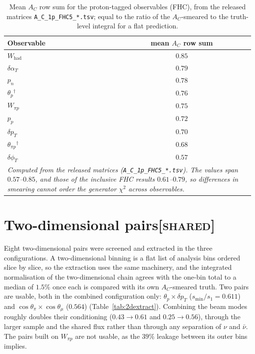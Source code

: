 \documentclass[11pt,a4paper]{article}
\newcommand{\scopetag}[1]{\hfill{\normalfont\small\textsc{[#1]}}}
\begin{document}
\begin{table}[H]
  \centering
  \caption{Mean $A_C$ row sum for the proton-tagged observables (FHC), from the released
    matrices \texttt{A\_C\_1p\_FHC5\_*.tsv}; equal to the ratio of the
    $A_C$-smeared to the truth-level integral for a flat prediction.}
  \label{tab:acwtki}
  \par\smallskip{}
  \begin{tabular}{lc}
      \toprule
      Observable & mean $A_C$ row sum \\
      \midrule
      $W_\mathrm{had}$   & $0.85$ \\
      $\delta\alpha_T$   & $0.79$ \\
      $p_n$              & $0.78$ \\
      $\theta_p$$^{\dagger}$         & $0.76$ \\
      $W_{\pi p}$        & $0.75$ \\
      $p_p$              & $0.72$ \\
      $\delta p_T$       & $0.70$ \\
      $\theta_{\pi p}$$^{\dagger}$      & $0.68$ \\
      $\delta\phi_T$     & $0.57$ \\
      \midrule
      \multicolumn{2}{p{0.72\textwidth}}{\emph{Computed from the released matrices
        (\texttt{A\_C\_1p\_FHC5\_*.tsv}). The values span $0.57$--$0.85$, and those of the
        inclusive FHC results $0.61$--$0.79$, so differences in smearing cannot order the
        generator $\chi^2$ across observables.}} \\
      \bottomrule
    \end{tabular}
\end{table}


\section[Two-dimensional pairs]{Two-dimensional pairs\scopetag{shared}}
\label{sec:supp_2d}

Eight two-dimensional pairs were screened and extracted in the three configurations. A
two-dimensional binning is a flat list of analysis bins ordered slice by slice, so the extraction
uses the same machinery, and the integrated normalisation of the two-dimensional chain agrees with
the one-bin total to a median of $1.5\%$ once each is compared with its own $A_C$-smeared truth.
Two pairs are usable, both in the combined configuration only: $\theta_p\times\delta p_T$
($s_{\min}/s_1=0.611$) and $\cos\theta_\pi\times\cos\theta_\mu$ ($0.564$) (Table~\ref{tab:2dextract}).
Combining the beam modes roughly doubles their conditioning ($0.43\to0.61$ and $0.25\to0.56$), through
the larger sample and the shared flux rather than through any separation of $\nu$ and $\bar\nu$. The
pairs built on $W_{\pi p}$ are not usable, as the $39\%$ leakage between its outer bins implies.
\end{document}
